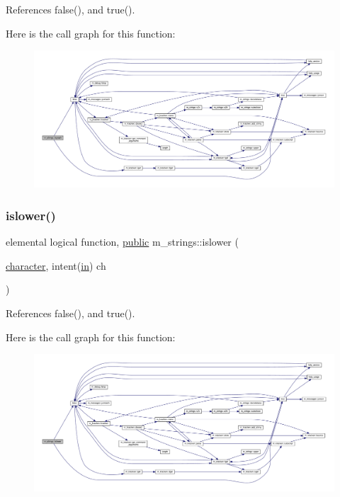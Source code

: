 References false(), and true().

Here is the call graph for this function\+:
\nopagebreak
\begin{figure}[H]
\begin{center}
\leavevmode
\includegraphics[width=350pt]{namespacem__strings_a84c80fdeeba0679488ed8ad8d37e53c5_cgraph}
\end{center}
\end{figure}
\mbox{\label{namespacem__strings_a9de5290748f02f575f3b7b859ff074ed}} 
\subsubsection{\texorpdfstring{islower()}{islower()}}
{\footnotesize\ttfamily elemental logical function, \hyperlink{M__stopwatch_83_8txt_a2f74811300c361e53b430611a7d1769f}{public} m\+\_\+strings\+::islower (\begin{DoxyParamCaption}\item[{\hyperlink{option__stopwatch_83_8txt_abd4b21fbbd175834027b5224bfe97e66}{character}, intent(\hyperlink{M__journal_83_8txt_afce72651d1eed785a2132bee863b2f38}{in})}]{ch }\end{DoxyParamCaption})}



References false(), and true().

Here is the call graph for this function\+:
\nopagebreak
\begin{figure}[H]
\begin{center}
\leavevmode
\includegraphics[width=350pt]{namespacem__strings_a9de5290748f02f575f3b7b859ff074ed_cgraph}
\end{center}
\end{figure}
\mbox{\label{namespacem__strings_a267f2fde729a75496c82a64754a91e54}} 
